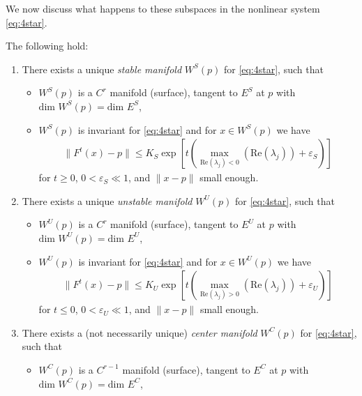 We now discuss what happens to these subspaces in the nonlinear system \eqref{eq:4star}.
\begin{theorem} \label{thm:center_mfd}
	The following hold:
	\begin{enumerate}
		\item There exists a unique \emph{stable manifold} $W^{S}(p)$ for \eqref{eq:4star}, such that
	\begin{itemize}
		\item $W^{S}(p)$ is a $C^{r}$ manifold (surface), tangent to $E^{S}$ at $p$ with $ \textrm{dim } W^{S}(p) =  \textrm{dim } E^{S}$,
		\item $W^{S}(p)$ is invariant for \eqref{eq:4star} and for $x\in W^{S}(p)$ we have 
			\begin{align}
				\| F^{t}(x)-p \| \leq K_{S} \exp\left[ t \left( \max_{ \textrm{Re} (\lambda_j) < 0}( \textrm{Re} (\lambda_j)) + \varepsilon_S \right) \right]
			\end{align}
	 for $t\geq 0$, $0 < \varepsilon_S \ll 1$, and  $\| x- p\|$ small enough.
	\end{itemize}
			
		\item There exists a unique \emph{unstable manifold} $W^{U}(p)$ for \eqref{eq:4star}, such that
	\begin{itemize}
		\item $W^{U}(p)$ is a $C^{r}$ manifold (surface), tangent to $E^{U}$ at $p$ with $ \textrm{dim } W^{U}(p) =  \textrm{dim } E^{U}$,
		\item $W^{U}(p)$ is invariant for \eqref{eq:4star} and for $x\in W^{U}(p)$ we have 
			\begin{align}
				\| F^{t}(x) -p\| \leq K_{U} \exp\left[ t \left( \max_{ \textrm{Re} (\lambda_j) > 0}( \textrm{Re} (\lambda_j)) + \varepsilon_U \right) \right]
			\end{align}
	 for $t\leq 0$, $0 < \varepsilon_U \ll 1$, and  $\| x- p\|$ small enough.
	\end{itemize}
			
\item There exists a (not necessarily unique) \emph{center manifold} $W^{C}(p)$ for \eqref{eq:4star}, such that
	\begin{itemize}
		\item $W^{C}(p)$ is a $C^{r-1}$ manifold (surface), tangent to $E^{C}$ at $p$ with $ \textrm{dim } W^{C}(p) =  \textrm{dim } E^{C}$,
	\end{itemize}
			
	\end{enumerate}
	
\end{theorem}
